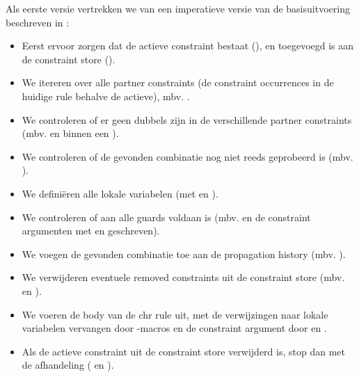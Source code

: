 Als eerste versie vertrekken we van een imperatieve versie van de basisuitvoering beschreven in \cite{tomsphdthesis}:
\begin{itemize}
  \item Eerst ervoor zorgen dat de actieve constraint bestaat (), en toegevoegd is aan de constraint store ().
  \item We itereren over alle partner constraints (de constraint occurrences in de huidige rule behalve de actieve), mbv. .
  \item We controleren of er geen dubbels zijn in de verschillende partner constraints (mbv.   en  binnen een ).
  \item We controleren of de gevonden combinatie nog niet reeds geprobeerd is (mbv. ).
  \item We defini\"eren alle lokale variabelen (met  en ).
  \item We controleren of aan alle guards voldaan is (mbv.  en de constraint argumenten met  en  geschreven).
  \item We voegen de gevonden combinatie toe aan de propagation history (mbv. ).
  \item We verwijderen eventuele removed constraints uit de constraint store (mbv.  en ).
  \item We voeren de body van de chr rule uit, met de verwijzingen naar lokale variabelen vervangen door -macros en de constraint argument door  en .
  \item Als de actieve constraint uit de constraint store verwijderd is, stop dan met de afhandeling ( en ).
\end{itemize}

